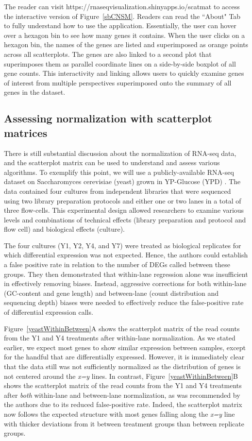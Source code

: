 \documentclass[11pt,a4paper,oldfontcommands,openany]{memoir}
\numberwithin{equation}{section} %
\begin{document}
The reader can visit https://rnaseqvisualization.shinyapps.io/scatmat to access the interactive version of Figure~\ref{sbCNSM}. Readers can read the ``About" Tab to fully understand how to use the application. Essentially, the user can hover over a hexagon bin to see how many genes it contains. When the user clicks on a hexagon bin, the names of the genes are listed and superimposed as orange points across all scatterplots. The genes are also linked to a second plot that superimposes them as parallel coordinate lines on a side-by-side boxplot of all gene counts. This interactivity and linking allows users to quickly examine genes of interest from multiple perspectives superimposed onto the summary of all genes in the dataset. 

\subsection{Assessing normalization with scatterplot matrices}

There is still substantial discussion about the normalization of RNA-seq data, and the scatterplot matrix can be used to understand and assess various algorithms. To exemplify this point, we will use a publicly-available RNA-seq dataset on Saccharomyces cerevisiae (yeast) grown in YP-Glucose (YPD) \citep{Risso}. The data contained four cultures from independent libraries that were sequenced using two library preparation protocols and either one or two lanes in a total of three flow-cells. This experimental design allowed researchers to examine various levels and combinations of technical effects (library preparation and protocol and flow cell) and biological effects (culture).

The four cultures (Y1, Y2, Y4, and Y7) were treated as biological replicates for which differential expression was not expected. Hence, the authors could establish a false positive rate in relation to the number of DEGs called between these groups. They then demonstrated that within-lane regression alone was insufficient in effectively removing biases. Instead, aggressive corrections for both within-lane (GC-content and gene length) and between-lane (count distribution and sequencing depth) biases were needed to effectively reduce the false-positive rate of differential expression calls.

Figure~\ref{yeastWithinBetween}A shows the scatterplot matrix of the read counts from the Y1 and Y4 treatments after within-lane normalization. As we stated earlier, we expect most genes to show similar expression between samples, except for the handful that are differentially expressed. However, it is immediately clear that the data still was not sufficiently normalized as the distribution of genes is not centered around the \textit{x=y} lines. In contrast, Figure~\ref{yeastWithinBetween}B shows the scatterplot matrix of the read counts from the Y1 and Y4 treatments after \textit{both} within-lane and between-lane normalization, as was recommended by the authors due to its reduced false-positive rate. Indeed, the scatterplot matrix now follows the expected structure with most genes falling along the \textit{x=y} line with thicker deviations from it between treatment groups than between replicate groups.
\end{document}
